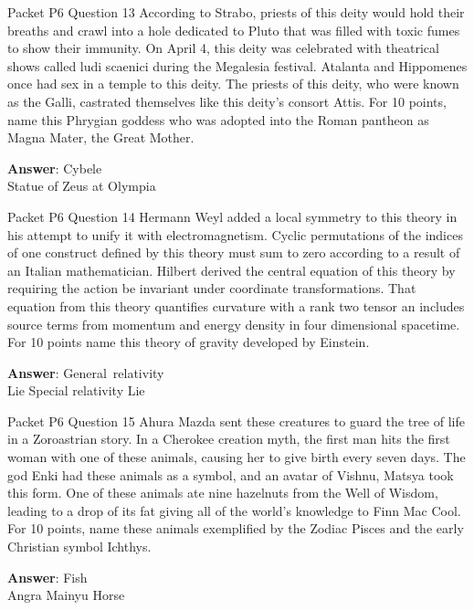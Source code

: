 \begin{frame}{Packet P6 Question 13}
According to Strabo, priests   of this deity would hold their breaths and crawl into a hole dedicated to Pluto that was filled with toxic fumes to show their immunity. On April 4, this deity was celebrated with theatrical shows called ludi scaenici during the Megalesia   festival. Atalanta   and Hippomenes once had sex in a temple   to this deity.   The priests of this deity, who were known as the Galli, castrated themselves like this deity’s consort Attis. For 10 points, name this Phrygian goddess who was adopted into the Roman pantheon as Magna Mater, the Great Mother.

\textbf{Answer}: Cybele\\
 Statue of Zeus at Olympia
\end{frame}

\begin{frame}{Packet P6 Question 14}
Hermann Weyl added a local symmetry to this theory in his attempt   to unify it with electromagnetism. Cyclic permutations of the indices of one construct defined by this theory must sum to zero according to a result of an Italian mathematician. Hilbert derived the central equation of this theory by requiring the action be invariant under coordinate transformations.   That equation from this theory quantifies curvature with a rank two tensor   an includes source terms from momentum and energy density in four dimensional spacetime. For 10 points   name this theory   of gravity developed by Einstein.  

\textbf{Answer}: General\ relativity\\
 Lie
 Special relativity
 Lie
\end{frame}

\begin{frame}{Packet P6 Question 15}
Ahura Mazda sent these   creatures to guard the tree of life in a Zoroastrian story. In a Cherokee creation myth, the first man hits the first woman with one of these animals, causing her to give birth every seven days. The god Enki had these animals as a symbol, and an avatar of Vishnu, Matsya took this form. One of these animals ate nine hazelnuts from the Well   of Wisdom, leading   to a drop of its fat giving all of the world's knowledge to Finn Mac Cool. For   10 points, name these animals exemplified by the Zodiac Pisces and the early Christian symbol Ichthys.  

\textbf{Answer}: Fish\\
 Angra Mainyu
 Horse
\end{frame}

